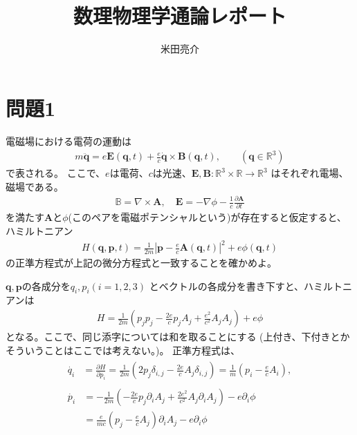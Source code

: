 \documentclass{jsarticle}
\begin{document}
\title{数理物理学通論レポート}
\author{米田亮介}
\date{}
\maketitle
\section*{問題1}
\begin{shaded}
電磁場における電荷の運動は
\begin{align}
m\ddot{\pmb{q}}=e\pmb{E}(\pmb{q},t)+\frac{e}{c}\dot{\pmb{q}}\times\pmb{B}(\pmb{q},t),\qquad(\pmb{q}\in \mathbb{R}^{3})
\end{align}
で表される。
ここで、$e$は電荷、$c$は光速、$\pmb{E},\pmb{B}:\mathbb{R}^{3}\times\mathbb{R}\to\mathbb{R}^{3}$
はそれぞれ電場、磁場である。
\begin{align}
\mathbb{B}=\nabla\times\pmb{A},\quad
\pmb{E}=-\nabla\phi-\frac{1}{c}\frac{\partial\pmb{A}}{\partial t}
\end{align}
を満たす$\pmb{A}$と$\phi$(このペアを電磁ポテンシャルという)が存在すると仮定すると、ハミルトニアン
\begin{align}
H(\pmb{q},\pmb{p},t)=\frac{1}{2m}\left|\pmb{p}-\frac{e}{c}\pmb{A}(\pmb{q},t)\right|^{2}+e\phi(\pmb{q},t)
\end{align}
の正準方程式が上記の微分方程式と一致することを確かめよ。
\end{shaded}
$\pmb{q},\pmb{p}$の各成分を$q_{i},p_{i}(i=1,2,3)$
とベクトルの各成分を書き下すと、ハミルトニアンは
\begin{align}
H=\frac{1}{2m}\left(p_{j}p_{j}-\frac{2e}{c}p_{j}A_{j}+\frac{e^{2}}{c^{2}}A_{j}A_{j}\right)+e\phi
\end{align}
となる。ここで、同じ添字については和を取ることにする
(上付き、下付きとかそういうことはここでは考えない。)。
正準方程式は、
\begin{align}
\begin{split}
\dot{q_{i}}&=\frac{\partial H}{\partial p_{i}}
=\frac{1}{2m}\left(2p_{j}\delta_{i,j}-\frac{2e}{c}A_{j}\delta_{i,j}\right)
=\frac{1}{m}\left(p_{i}-\frac{e}{c}A_{i}\right),
\end{split}\\
\begin{split}
\dot{p_{i}}&=-\frac{1}{2m}\left(-\frac{2e}{c}p_{j}\partial_{i}A_{j}
+\frac{2e^{2}}{c^{2}}A_{j}\partial_{i}A_{j}\right)
-e\partial_{i}\phi\\
&=\frac{e}{mc}\left(p_{j}
-\frac{e}{c}A_{j}\right)\partial_{i}A_{j}-e\partial_{i}\phi
\end{split}
\end{align}
\end{document}
